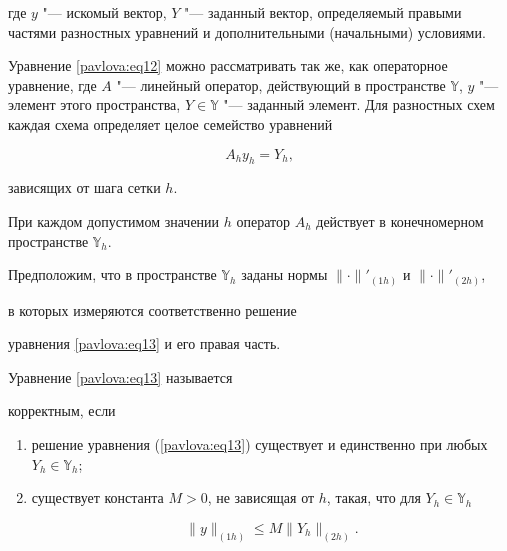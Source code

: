 где $y$ "--- искомый вектор, $Y$ "--- заданный вектор, определяемый правыми частями разностных уравнений и дополнительными (начальными) условиями.



Уравнение \eqref{pavlova:eq12} можно рассматривать так же, как операторное уравнение, где $A$ "--- линейный оператор, действующий в пространстве $\mathbb Y$, $y$ "--- элемент этого пространства, $Y\in \mathbb Y$ "--- заданный элемент. Для разностных схем каждая схема определяет целое семейство уравнений

\begin{equation}

\label{pavlova:eq13} A_h y_h =Y_h,

\end{equation}

зависящих от шага сетки $h$. 

При каждом допустимом значении $h$ оператор $A_h$ действует в конечномерном пространстве $\mathbb{Y}_h$.



Предположим, что в пространстве $\mathbb{Y}_h$ заданы нормы $\|\cdot\|'_{(1h)}$ и $\| \cdot \|'_{(2h)}$,

в которых измеряются соответственно решение

уравнения \eqref{pavlova:eq13} и его правая часть.



\begin{definition} Уравнение \eqref{pavlova:eq13} называется

корректным, если

\begin{enumerate}

\item[1)] решение уравнения (\ref{pavlova:eq13}) существует и единственно при любых $Y_h \in \mathbb{Y}_h$;

\item[2)] существует константа $M>0$, не зависящая от $h$, такая, что для $Y_h \in \mathbb{Y}_h$

\begin{equation}

\label{pavlova:eq14}

\| y \|_{(1h)} \le M\|Y_h \|_{(2h)}.

\end{equation}



\end{enumerate}

\end{definition}



